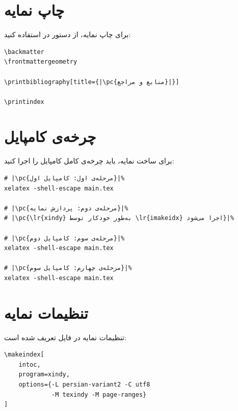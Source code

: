 
\section{چاپ نمایه}
\label{sec:index-print}

برای چاپ نمایه، از دستور  در
 استفاده کنید:

\begin{latin}
\begin{verbatim}
\backmatter
\frontmattergeometry

\printbibliography[title={|\pc{منابع و مراجع}|}]

\printindex
\end{verbatim}
\end{latin}


\section{چرخه‌ی کامپایل}
\label{sec:index-compile}

برای ساخت نمایه، باید چرخه‌ی کامل کامپایل را
اجرا کنید:

\begin{latin}
\begin{verbatim}
# |\pc{مرحله‌ی اول: کامپایل اول}|%
xelatex -shell-escape main.tex

# |\pc{مرحله‌ی دوم: پردازش نمایه}|%
# |\pc{\lr{xindy} به‌طور خودکار توسط \lr{imakeidx} اجرا می‌شود}|%

# |\pc{مرحله‌ی سوم: کامپایل دوم}|%
xelatex -shell-escape main.tex

# |\pc{مرحله‌ی چهارم: کامپایل سوم}|%
xelatex -shell-escape main.tex
\end{verbatim}
\end{latin}


\section{تنظیمات نمایه}
\label{sec:index-settings}

تنظیمات نمایه در فایل  تعریف
شده است:

\begin{latin}
\begin{verbatim}
\makeindex[
    intoc,
    program=xindy,
    options={-L persian-variant2 -C utf8
             -M texindy -M page-ranges}
]
\end{verbatim}
\end{latin}


